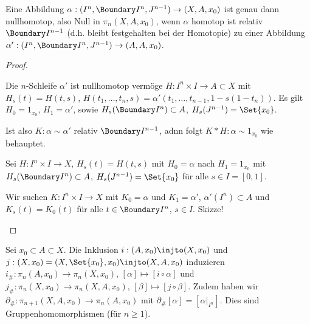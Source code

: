 \begin{lem}[Kompressionslemma]
    Eine Abbildung $\alpha: (I^n, \Boundary I^n, J^{n-1}) \to (X, A, x_0)$ ist genau dann nullhomotop, also Null in $\pi_n(X, A, x_0)$, wenn $\alpha$ homotop ist relativ $\Boundary I^{n-1}$ (d.h. bleibt festgehalten bei der Homotopie) zu einer Abbildung $\alpha': (I^n, \Boundary I^n, J^{n-1}) \to (A, A, x_0)$.
    \begin{proof}
        \begin{seg}{\ProofImplication*}
            Die $n$-Schleife $\alpha'$ ist nullhomotop vermöge $H: I^n \times I \to A \subset X$ mit $H_s(t) = H(t,s)$,
            \begin{math}
                H(t_1, \dotsc, t_n, s) = \alpha'(t_1, \dotsc, t_{n-1}, 1 - s(1-t_n)).
            \end{math}
            Es gilt $H_0 = 1_{x_0}$, $H_1 = \alpha'$, sowie $H_s(\Boundary I^n) \subset A$, $H_s(J^{n-1}) = \Set{x_0}$.

            Ist also $K: \alpha \sim \alpha'$ relativ $\Boundary I^{n-1}$, adnn folgt $K \ast H: \alpha \sim 1_{x_0}$ wie behauptet.
        \end{seg}
        \begin{seg}{\ProofImplication}
            Sei $H: I^n \times I \to X$, $H_s(t) = H(t,s)$ mit $H_0 = \alpha$ nach $H_1 = 1_{x_0}$ mit $H_s(\Boundary I^n) \subset A$, $H_s(J^{n-1}) = \Set{x_0}$ für alle $s \in I = [0,1]$.

            Wir suchen $K: I^n \times I \to X$ mit $K_0 = \alpha$ und $K_1 = \alpha'$, $\alpha'(I^n) \subset A$ und $K_s(t) = K_0(t)$ für alle $t \in \Boundary I^n$, $s \in I$.
            Skizze!
        \end{seg}
    \end{proof}
\end{lem}


Sei $x_0 \subset A \subset X$.
Die Inklusion $i: (A, x_0) \injto (X, x_0)$ und $j: (X, x_0) = (X, \Set{x_0}, x_0) \injto (X, A, x_0)$ induzieren $i_\#: \pi_n(A,x_0) \to \pi_n(X,x_0)$, $[\alpha] \mapsto [i \circ \alpha]$ und $j_\#: \pi_n(X, x_0) \to \pi_n(X, A, x_0)$, $[\beta] \mapsto [j \circ \beta]$.
Zudem haben wir $\partial_\#: \pi_{n+1}(X, A, x_0) \to \pi_n(A, x_0)$ mit $\partial_\#[\alpha] = [\alpha|_{I^n}]$.
Dies sind Gruppenhomomorphismen (für $n \ge 1$).

